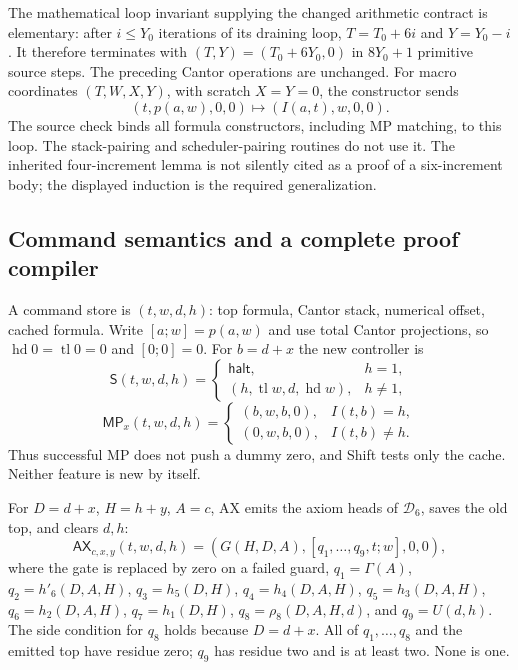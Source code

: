 The mathematical loop invariant supplying the changed arithmetic
contract is elementary: after $i\leq Y_0$ iterations of its draining
loop, $T=T_0+6i$ and $Y=Y_0-i$. It therefore terminates with
$(T,Y)=(T_0+6Y_0,0)$ in $8Y_0+1$ primitive source steps. The preceding
Cantor operations are unchanged. For macro coordinates $(T,W,X,Y)$,
with scratch $X=Y=0$, the constructor sends
\[
 (t,p(a,w),0,0)\longmapsto(I(a,t),w,0,0).
\]
The source check binds all formula constructors, including MP matching,
to this loop. The stack-pairing and scheduler-pairing routines do not
use it. The inherited four-increment lemma is not silently cited as
a proof of a six-increment body; the displayed induction is the required
generalization.

\subsection{Command semantics and a complete proof compiler}

A command store is $(t,w,d,h)$: top formula, Cantor stack, numerical
offset, cached formula. Write $[a;w]=p(a,w)$ and use total Cantor
projections, so $\operatorname{hd}0=\operatorname{tl}0=0$ and
$[0;0]=0$. For $b=d+x$ the new controller is
\[
 \mathsf S(t,w,d,h)=
 \begin{cases}\mathsf{halt},&h=1,\\
 (h,\operatorname{tl}w,d,\operatorname{hd}w),&h\ne1,
 \end{cases}
\]
\[
 \mathsf{MP}_x(t,w,d,h)=
 \begin{cases}(b,w,b,0),&I(t,b)=h,\\
 (0,w,b,0),&I(t,b)\ne h.
 \end{cases}                                             \tag{3}
\]
Thus successful MP does not push a dummy zero, and Shift tests only the
cache. Neither feature is new by itself.

For $D=d+x$, $H=h+y$, $A=c$, AX emits the axiom heads of
$\mathcal D_6$, saves the old top, and clears $d,h$:
\[
 \mathsf{AX}_{c,x,y}(t,w,d,h)=
 (G(H,D,A),[q_1,\ldots,q_9,t;w],0,0),
\]
where the gate is replaced by zero on a failed guard,
$q_1=\Gamma(A)$, $q_2=h'_6(D,A,H)$, $q_3=h_5(D,H)$,
$q_4=h_4(D,A,H)$, $q_5=h_3(D,A,H)$, $q_6=h_2(D,A,H)$,
$q_7=h_1(D,H)$, $q_8=\rho_8(D,A,H,d)$, and $q_9=U(d,h)$.
The side condition for $q_8$ holds because $D=d+x$.
All of $q_1,\ldots,q_8$ and the emitted top have residue zero;
$q_9$ has residue two and is at least two. None is one.

